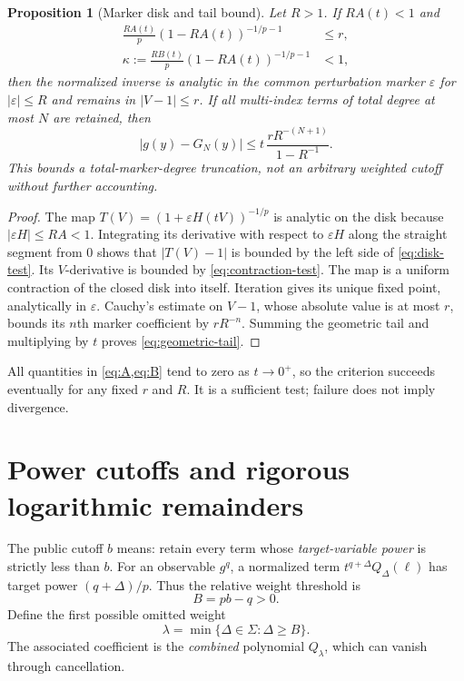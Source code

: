 \documentclass[11pt,a4paper]{article}
\numberwithin{equation}{section}
\newtheorem{proposition}[theorem]{Proposition}
\theoremstyle{definition}\newtheorem{definition}[theorem]{Definition}
\theoremstyle{remark}\newtheorem{remark}[theorem]{Remark}
\begin{document}
\begin{proposition}[Marker disk and tail bound]
\label{prop:contraction}
Let $R>1$. If $RA(t)<1$ and
\begin{align}
 \frac{RA(t)}p(1-RA(t))^{-1/p-1}&\le r,\label{eq:disk-test}\\
 \kappa:=\frac{RB(t)}p(1-RA(t))^{-1/p-1}&<1,\label{eq:contraction-test}
\end{align}
then the normalized inverse is analytic in the common perturbation marker
$\varepsilon$ for $|\varepsilon|\le R$ and remains in $|V-1|\le r$.
If all multi-index terms of total degree at most $N$ are retained, then
\begin{equation}
 |g(y)-G_N(y)|\le
 t\,\frac{rR^{-(N+1)}}{1-R^{-1}}.
 \label{eq:geometric-tail}
\end{equation}
This bounds a total-marker-degree truncation, not an arbitrary weighted
cutoff without further accounting.
\end{proposition}

\begin{proof}
The map $T(V)=(1+\varepsilon H(tV))^{-1/p}$ is analytic on the disk because
$|\varepsilon H|\le RA<1$. Integrating its derivative with respect to
$\varepsilon H$ along the straight segment from $0$ shows that
$|T(V)-1|$ is bounded by the left side of \cref{eq:disk-test}. Its
$V$-derivative is bounded by \cref{eq:contraction-test}. The map is a
uniform contraction of the closed disk into itself. Iteration gives its
unique fixed point, analytically in $\varepsilon$. Cauchy's estimate on
$V-1$, whose absolute value is at most $r$, bounds its $n$th marker
coefficient by $rR^{-n}$. Summing the geometric tail and multiplying by
$t$ proves \cref{eq:geometric-tail}.
\end{proof}

All quantities in \cref{eq:A,eq:B} tend to zero as $t\to0^+$, so the
criterion succeeds eventually for any fixed $r$ and $R$. It is a
sufficient test; failure does not imply divergence.

\section{Power cutoffs and rigorous logarithmic remainders}
\label{sec:remainders}

The public cutoff $b$ means: retain every term whose \emph{target-variable
power} is strictly less than $b$. For an observable $g^q$, a normalized
term $t^{q+\Delta}Q_\Delta(\ell)$ has target power $(q+\Delta)/p$.
Thus the relative weight threshold is
\begin{equation}
 B=pb-q>0.
 \label{eq:relative-cutoff}
\end{equation}
Define the first possible omitted weight
\begin{equation}
 \lambda=\min\{\Delta\in\Sigma:\Delta\ge B\}.
 \label{eq:frontier}
\end{equation}
The associated coefficient is the \emph{combined} polynomial
$Q_\lambda$, which can vanish through cancellation.
\end{document}
